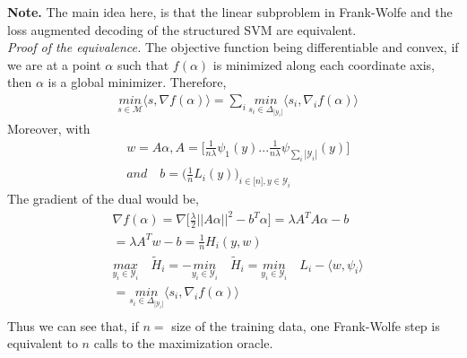 \documentclass{article}
\begin{document}
\textbf{Note.} The main idea here, is that the linear subproblem in Frank-Wolfe and the loss augmented decoding of the structured SVM are equivalent.
\\
\textit{Proof of the equivalence.} The objective function being differentiable and convex, if we are at a point $\alpha$ 
such that $f(\alpha)$ is minimized along each coordinate axis, then $\alpha$ is a global minimizer. Therefore,
\begin{equation*}
\begin{aligned}
    &\underset{s\in\mathcal{M}}{\textit{min}}\langle s, \nabla f(\alpha)\rangle = \sum_{i}\underset{s_{i}\in\Delta_{|\mathcal{Y}_{i}|}}{\textit{min}}\langle s_{i}, \nabla_{i} f(\alpha)\rangle
\end{aligned}
\end{equation*}
Moreover, with 
\begin{equation*}
\begin{aligned}
   &w=A\alpha, A=\Big[\frac{1}{n\lambda}\psi_{1}(y)...\frac{1}{n\lambda}\psi_{\sum_{i}|\mathcal{Y}_{i}|}(y)\Big]\\
   &\textit{and}\quad b=\Big(\frac{1}{n}L_{i}(y)\Big)_{i\in\big[n\big],y\in\mathcal{Y}_{i}}
\end{aligned}
\end{equation*} 
The gradient of the dual would be, 
\begin{equation*}
\begin{aligned}
    &\nabla f(\alpha)= \nabla\Big[\frac{\lambda}{2}||A\alpha||^{2}- b^{T}\alpha\Big] = \lambda A^{T}A\alpha- b\\
    &= \lambda A^{T}w- b= \frac{1}{n}H_{i}(y,w)\\
    &\underset{y_{i}\in\mathcal{Y}_{i}}{\textit{max}}\quad\tilde{H}_{i}= -\underset{y_{i}\in\mathcal{Y}_{i}}{\textit{min}}\quad\tilde{H}_{i} = \underset{y_{i}\in\mathcal{Y}_{i}}{\textit{min}}\quad L_{i}- \langle w, \psi_{i}\rangle\\
    &= \underset{s_{i}\in\Delta_{|\mathcal{Y}_{i}|}}{\textit{min}}\langle s_{i}, \nabla_{i} f(\alpha)\rangle\\
\end{aligned}
\end{equation*}
Thus we can see that, if $n=$ size of the training data, one Frank-Wolfe step is equivalent to $n$ calls to the maximization oracle.
\end{document}
